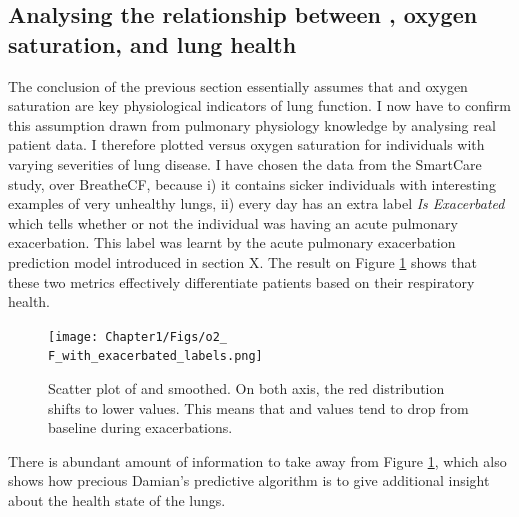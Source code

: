 \subsection{Analysing the relationship between \F, oxygen saturation, and lung health}
The conclusion of the previous section essentially assumes that \F and oxygen saturation are key physiological indicators of lung function. I now have to confirm this assumption drawn from pulmonary physiology knowledge by analysing real patient data. I therefore plotted \F versus oxygen saturation for individuals with varying severities of lung disease. I have chosen the data from the SmartCare study, over BreatheCF, because i) it contains sicker individuals with interesting examples of very unhealthy lungs, ii) every day has an extra label \textit{Is Exacerbated} which tells whether or not the individual was having an acute pulmonary exacerbation. This label was learnt by the acute pulmonary exacerbation prediction model introduced in section X. The result on Figure \ref{fig:o2_\F_exacerbated} shows that these two metrics effectively differentiate patients based on their respiratory health. 

\begin{figure}[!h]
    \caption{Scatter plot of \OXSat and \F smoothed. On both axis, the red distribution shifts to lower values. This means that \OXSat and \F values tend to drop from baseline during exacerbations.}
    \centering
    \texttt{[image: Chapter1/Figs/o2\_\\F\_with\_exacerbated\_labels.png]}
    \label{fig:o2_\F_exacerbated}
\end{figure}

There is abundant amount of information to take away from Figure \ref{fig:o2_\F_exacerbated}, which also shows how precious Damian's predictive algorithm is to give additional insight about the health state of the lungs.

